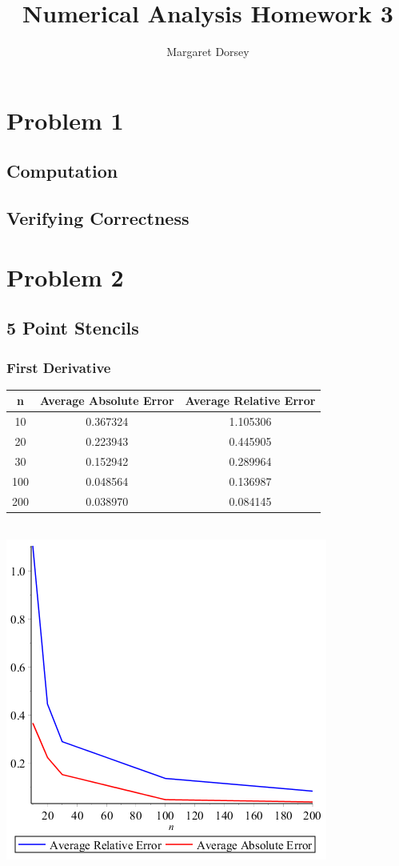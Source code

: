 \documentclass[11pt]{article} %
\title{Numerical Analysis Homework 3}
\author{Margaret Dorsey}
\begin{document}
\maketitle

\section*{Problem 1}
\subsection*{Computation}

\subsection*{Verifying Correctness}

\section*{Problem 2}
\subsection*{5 Point Stencils}
\subsubsection*{First Derivative}
\begin{tabular}{c | c | c }
n & Average Absolute Error & Average Relative Error \\
\hline
10 & 0.367324 & 1.105306 \\
20 & 0.223943& 0.445905\\
30 &0.152942&  0.289964\\
100 & 0.048564 & 0.136987 \\
200 &0.038970 &0.084145\\
\end{tabular}\\
\includegraphics[scale=.5]{plots/problem2firstderivplot.png}
\end{document}
